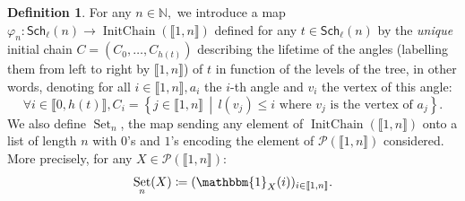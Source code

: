 \documentclass[a4paper,10pt]{amsart}
\DeclareMathOperator{\IC}{InitChain}
\DeclareMathOperator{\Set}{Set}
\newcommand\Schl{\mathsf{Sch}_\ell}
\newcommand\NN{\mathbb{N}}
\newcommand{\IEM}[2]{\llbracket #1,#2 \rrbracket}
\theoremstyle{definition}
\newtheorem{defi}{Definition}
\begin{document}
\begin{defi}\label{defi:lifetime}
	For any $n\in\NN,$ we introduce a map $\varphi_n: \Schl(n)\rightarrow \IC(\IEM{1}{n})$ defined for any $t\in\Schl(n)$ by the \emph{unique} initial chain $C=\left(C_0,\dots,C_{h(t)}\right)$ describing the lifetime of the angles (labelling them from left to right by $\IEM{1}{n}$) of $t$ in function of the levels of the tree, in other words, denoting for all $i\in\IEM{1}{n},a_i$ the $i$-th angle and $v_i$ the vertex of this angle:
	\[
	\forall i \in\IEM{0}{h(t)}, C_i=\left\{ j \in\IEM{1}{n} \,\middle|\, l(v_j)\leq i \text{ where } v_j \text{ is the vertex of }a_j\right\}.
	\]
	We also define $\Set_n$, the map sending any element of $\IC(\IEM{1}{n})$ onto a list of length $n$ with $0$'s and $1$'s encoding the element of $\mathcal{P}(\IEM{1}{n})$ considered. More precisely, for any ${X\in\mathcal{P}(\IEM{1}{n})}$:
	\[
	\Set_n(X)\coloneq (\mathbbm{1}_X(i))_{i\in\IEM{1}{n}}.
	\]
\end{defi}
\end{document}
